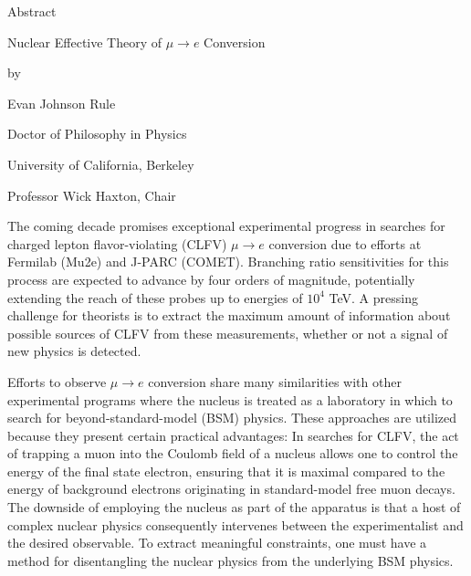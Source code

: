 \documentclass[12pt,letterpaper]{book}
\begin{document}
\cleardoublepage
\newpage
{}
\begin{center}
Abstract

\vspace{1cm}
Nuclear Effective Theory of $\mu\rightarrow e$ Conversion

\vspace{0.5cm}
by

\vspace{0.5cm}
Evan Johnson Rule

\vspace{0.5cm}
Doctor of Philosophy in Physics

\vspace{0.5cm}
University of California, Berkeley

\vspace{0.5cm}
Professor Wick Haxton, Chair
\end{center}
The coming decade promises exceptional experimental progress in searches for charged lepton flavor-violating (CLFV) $\mu\rightarrow e$ conversion due to efforts at Fermilab (Mu2e) and J-PARC (COMET). Branching ratio sensitivities for this process are expected to advance by four orders of magnitude, potentially extending the reach of these probes up to energies of $10^4$ TeV. A pressing challenge for theorists is to extract the maximum amount of information about possible sources of CLFV from these measurements, whether or not a signal of new physics is detected. 

Efforts to observe $\mu\rightarrow e$ conversion share many similarities with other experimental programs where the nucleus is treated as a laboratory in which to search for beyond-standard-model (BSM) physics. These approaches are utilized because they present certain practical advantages: In searches for CLFV, the act of trapping a muon into the Coulomb field of a nucleus allows one to control the energy of the final state electron, ensuring that it is maximal compared to the energy of background electrons originating in standard-model free muon decays. The downside of employing the nucleus as part of the apparatus is that a host of complex nuclear physics consequently intervenes between the experimentalist and the desired observable. To extract meaningful constraints, one must have a method for disentangling the nuclear physics from the underlying BSM physics.
\end{document}
